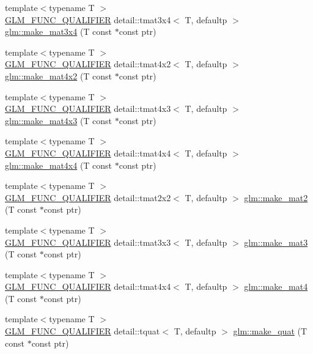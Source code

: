 \begin{DoxyCompactItemize}
\item 
{\footnotesize template$<$typename T $>$ }\\\hyperlink{setup_8hpp_a33fdea6f91c5f834105f7415e2a64407}{G\+L\+M\+\_\+\+F\+U\+N\+C\+\_\+\+Q\+U\+A\+L\+I\+F\+I\+ER} detail\+::tmat3x4$<$ T, defaultp $>$ \hyperlink{group__gtc__type__ptr_gaa0c07ac459a5e16374aa12e3b35ee043}{glm\+::make\+\_\+mat3x4} (T const $\ast$const ptr)
\item 
{\footnotesize template$<$typename T $>$ }\\\hyperlink{setup_8hpp_a33fdea6f91c5f834105f7415e2a64407}{G\+L\+M\+\_\+\+F\+U\+N\+C\+\_\+\+Q\+U\+A\+L\+I\+F\+I\+ER} detail\+::tmat4x2$<$ T, defaultp $>$ \hyperlink{group__gtc__type__ptr_gae4ad99adfe4fb195a192712a71de901d}{glm\+::make\+\_\+mat4x2} (T const $\ast$const ptr)
\item 
{\footnotesize template$<$typename T $>$ }\\\hyperlink{setup_8hpp_a33fdea6f91c5f834105f7415e2a64407}{G\+L\+M\+\_\+\+F\+U\+N\+C\+\_\+\+Q\+U\+A\+L\+I\+F\+I\+ER} detail\+::tmat4x3$<$ T, defaultp $>$ \hyperlink{group__gtc__type__ptr_ga37ec66362c22d86ad2ee11930b638c4a}{glm\+::make\+\_\+mat4x3} (T const $\ast$const ptr)
\item 
{\footnotesize template$<$typename T $>$ }\\\hyperlink{setup_8hpp_a33fdea6f91c5f834105f7415e2a64407}{G\+L\+M\+\_\+\+F\+U\+N\+C\+\_\+\+Q\+U\+A\+L\+I\+F\+I\+ER} detail\+::tmat4x4$<$ T, defaultp $>$ \hyperlink{group__gtc__type__ptr_ga4b13ff6840a66d032724a9a1db50f704}{glm\+::make\+\_\+mat4x4} (T const $\ast$const ptr)
\item 
{\footnotesize template$<$typename T $>$ }\\\hyperlink{setup_8hpp_a33fdea6f91c5f834105f7415e2a64407}{G\+L\+M\+\_\+\+F\+U\+N\+C\+\_\+\+Q\+U\+A\+L\+I\+F\+I\+ER} detail\+::tmat2x2$<$ T, defaultp $>$ \hyperlink{group__gtc__type__ptr_ga903422b2c346cbaccad3153a5a1f404c}{glm\+::make\+\_\+mat2} (T const $\ast$const ptr)
\item 
{\footnotesize template$<$typename T $>$ }\\\hyperlink{setup_8hpp_a33fdea6f91c5f834105f7415e2a64407}{G\+L\+M\+\_\+\+F\+U\+N\+C\+\_\+\+Q\+U\+A\+L\+I\+F\+I\+ER} detail\+::tmat3x3$<$ T, defaultp $>$ \hyperlink{group__gtc__type__ptr_gae50ecac46eb8771fb074e310b602bf53}{glm\+::make\+\_\+mat3} (T const $\ast$const ptr)
\item 
{\footnotesize template$<$typename T $>$ }\\\hyperlink{setup_8hpp_a33fdea6f91c5f834105f7415e2a64407}{G\+L\+M\+\_\+\+F\+U\+N\+C\+\_\+\+Q\+U\+A\+L\+I\+F\+I\+ER} detail\+::tmat4x4$<$ T, defaultp $>$ \hyperlink{group__gtc__type__ptr_gac3920fd61f0c459a4749b8eb9107982c}{glm\+::make\+\_\+mat4} (T const $\ast$const ptr)
\item 
{\footnotesize template$<$typename T $>$ }\\\hyperlink{setup_8hpp_a33fdea6f91c5f834105f7415e2a64407}{G\+L\+M\+\_\+\+F\+U\+N\+C\+\_\+\+Q\+U\+A\+L\+I\+F\+I\+ER} detail\+::tquat$<$ T, defaultp $>$ \hyperlink{group__gtc__type__ptr_ga051ec24a44af31a08b11eccbf8726b02}{glm\+::make\+\_\+quat} (T const $\ast$const ptr)
\end{DoxyCompactItemize}


